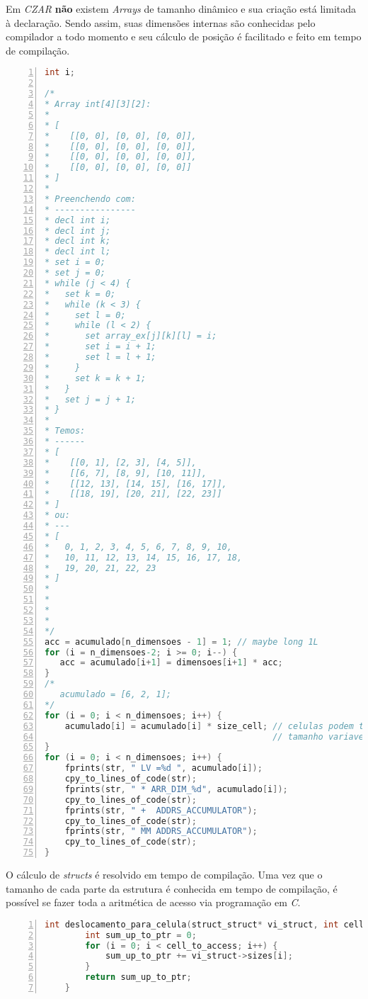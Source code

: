 Em \emph{CZAR} \textbf{não} existem \emph{Arrays} de tamanho dinâmico e sua criação está
limitada à declaração. Sendo assim, suas dimensões internas são conhecidas pelo
compilador a todo momento e seu cálculo de posição é facilitado e feito em
tempo de compilação. 

\begin{lstlisting}[frame=single,numbers=left,breaklines=true, language=C]
int i;

/* 
* Array int[4][3][2]: 
*
* [
*    [[0, 0], [0, 0], [0, 0]], 
*    [[0, 0], [0, 0], [0, 0]], 
*    [[0, 0], [0, 0], [0, 0]], 
*    [[0, 0], [0, 0], [0, 0]]
* ]
*
* Preenchendo com:
* ----------------
* decl int i;
* decl int j;
* decl int k;
* decl int l; 
* set i = 0;
* set j = 0;
* while (j < 4) {
*   set k = 0;
*   while (k < 3) {
*     set l = 0;
*     while (l < 2) {
*       set array_ex[j][k][l] = i;
*       set i = i + 1;
*       set l = l + 1;
*     }
*     set k = k + 1;
*   }
*   set j = j + 1;
* }
*
* Temos:
* ------
* [
*    [[0, 1], [2, 3], [4, 5]], 
*    [[6, 7], [8, 9], [10, 11]], 
*    [[12, 13], [14, 15], [16, 17]], 
*    [[18, 19], [20, 21], [22, 23]]
* ]
* ou:
* ---
* [
*   0, 1, 2, 3, 4, 5, 6, 7, 8, 9, 10,
*   10, 11, 12, 13, 14, 15, 16, 17, 18, 
*   19, 20, 21, 22, 23
* ]
*
*
*
*
*/
acc = acumulado[n_dimensoes - 1] = 1; // maybe long 1L 
for (i = n_dimensoes-2; i >= 0; i--) {
   acc = acumulado[i+1] = dimensoes[i+1] * acc;
}
/* 
   acumulado = [6, 2, 1];
*/
for (i = 0; i < n_dimensoes; i++) {
    acumulado[i] = acumulado[i] * size_cell; // celulas podem ter 
                                             // tamanho variavel
}
for (i = 0; i < n_dimensoes; i++) {
    fprints(str, " LV =%d ", acumulado[i]);
    cpy_to_lines_of_code(str);
    fprints(str, " * ARR_DIM_%d", acumulado[i]);
    cpy_to_lines_of_code(str);
    fprints(str, " +  ADDRS_ACCUMULATOR");
    cpy_to_lines_of_code(str);
    fprints(str, " MM ADDRS_ACCUMULATOR");
    cpy_to_lines_of_code(str);
}
\end{lstlisting}

O cálculo de \emph{structs} é resolvido em tempo de compilação. Uma vez que o
tamanho de cada parte da estrutura é conhecida em tempo de compilação, é
possível se fazer toda a aritmética de acesso via programação em \emph{C}. 

\begin{lstlisting}[frame=single,numbers=left,breaklines=true, language=C]
    int deslocamento_para_celula(struct_struct* vi_struct, int cell_to_access) {
        int sum_up_to_ptr = 0;
        for (i = 0; i < cell_to_access; i++) {
            sum_up_to_ptr += vi_struct->sizes[i];
        }
        return sum_up_to_ptr;
    }
\end{lstlisting}
